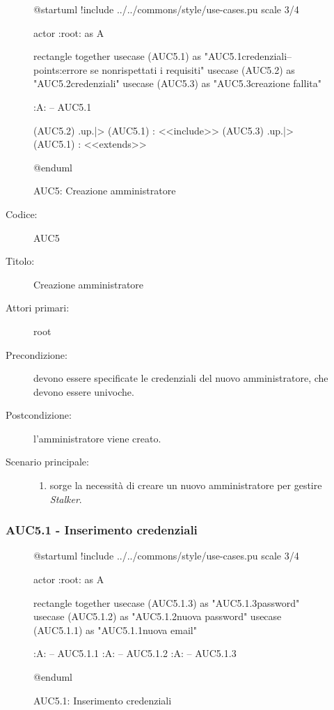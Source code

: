 \documentclass[casi-duso]{subfiles}
\begin{document}
\begin{figure}[h!]
  \centering
  \begin{plantuml}
  @startuml
  !include ../../commons/style/use-cases.pu
  scale 3/4

  actor :root: as A

  rectangle {
    together {
      usecase (AUC5.1) as "AUC5.1\nInserimento credenziali\n--\nExtension points:\nvisualizzazione errore se non\nvengono rispettati i requisiti"
      usecase (AUC5.2) as "AUC5.2\nVerifica credenziali"
      usecase (AUC5.3) as "AUC5.3\nVisualizza creazione fallita"
    }
  }

  :A: -- AUC5.1

  (AUC5.2) .up.|> (AUC5.1) : <<include>>
  (AUC5.3) .up.|> (AUC5.1) : <<extends>>

  @enduml
  \end{plantuml}
  \caption{AUC5: Creazione amministratore}
  \label{fig:auc5}
\end{figure}

\begin{description}
  \item[Codice:] AUC5
  \item[Titolo:] Creazione amministratore
  \item[Attori primari:] root
  \item[Precondizione:] devono essere specificate le credenziali del nuovo amministratore, che devono essere univoche.
  \item[Postcondizione:] l'amministratore viene creato.
  \item[Scenario principale:]
  \begin{enumerate}
    \item sorge la necessità di creare un nuovo amministratore per gestire \emph{Stalker}.
  \end{enumerate}
\end{description}


\subsubsection{AUC5.1 - Inserimento credenziali}%
\label{subsub:AUC5.1}

\begin{figure}[h!]
  \centering
  \begin{plantuml}
  @startuml
  !include ../../commons/style/use-cases.pu
  scale 3/4

  actor :root: as A

  rectangle {
    together {
      usecase (AUC5.1.3) as "AUC5.1.3\nConferma password"
      usecase (AUC5.1.2) as "AUC5.1.2\nInserimento nuova password"
      usecase (AUC5.1.1) as "AUC5.1.1\nInserimento nuova email"
    }
  }

  :A: -- AUC5.1.1
  :A: -- AUC5.1.2
  :A: -- AUC5.1.3

  @enduml
  \end{plantuml}
  \caption{AUC5.1: Inserimento credenziali}
  \label{fig:auc5_1}
\end{figure}
\end{document}
